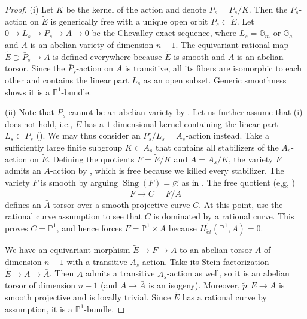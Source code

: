 \documentclass[reqno, letterpaper]{amsart}
\numberwithin{equation}{subsection}
\let\emptyset\varnothing
\let\to\longrightarrow
\newcommand{\GG}{\mathbb{G}}
\newcommand{\PP}{\mathbb{P}}
\DeclareMathOperator{\Sing}{Sing}
\begin{document}
		\begin{proof}
			(i) Let $K$ be the kernel of the action and denote $\bar P_s = P^\circ_s / K$. Then the $\bar P_s$-action on $\tilde E$ is generically free with a unique open orbit $\bar P_s \subset \tilde E$. Let $0 \to \bar L_s \to \bar P_s \to A \to 0$ be the Chevalley exact sequence, where $\bar L_s = \GG_m$ or $\GG_a$ and $A$ is an abelian variety of dimension $n-1$. The equivariant rational map $\tilde E \supset \bar P_s \to A$ is defined everywhere because $\tilde E$ is smooth and $A$ is an abelian torsor. Since the $\bar P_s$-action on $A$ is transitive, all its fibers are isomorphic to each other and contains the linear part $\bar L_s$ as an open subset. Generic smoothness shows it is a $\PP^1$-bundle.
			
			\medskip
			
			(ii) Note that $P_s$ cannot be an abelian variety by . Let us further assume that (i) does not hold, i.e., $E$ has a $1$-dimensional kernel containing the linear part $L_s \subset P^\circ_s$ (). We may thus consider an $P_s^\circ/L_s = A_s$-action instead. Take a sufficiently large finite subgroup $K \subset A_s$ that contains all stabilizers of the $A_s$-action on $\tilde E$. Defining the quotients $F = \tilde E / K$ and $\bar A = A_s / K$, the variety $F$ admits an $\bar A$-action by , which is free because we killed every stabilizer. The variety $F$ is smooth by arguing $\Sing(F) = \emptyset$ as in . The free quotient (e,g, \cite[Tag~06PH]{stacks-project})
			\[ F \to C = F/\bar A \]
			defines an $\bar A$-torsor over a smooth projective curve $C$. At this point, use the rational curve assumption to see that $C$ is dominated by a rational curve. This proves $C = \PP^1$, and hence forces $F = \PP^1 \times \bar A$ because $H^1_{\acute et} (\PP^1, \bar A) = 0$.
			
			\medskip
			
			We have an equivariant morphism $\tilde E \to F \to \bar A$ to an abelian torsor $\bar A$ of dimension $n-1$ with a transitive $A_s$-action. Take its Stein factorization $\tilde E \to A \to \bar A$. Then $A$ admits a transitive $A_s$-action as well, so it is an abelian torsor of dimension $n-1$ (and $A \to \bar A$ is an isogeny). Moreover, $\tilde p : \tilde E \to A$ is smooth projective and is locally trivial. Since $\tilde E$ has a rational curve by assumption, it is a $\PP^1$-bundle.
		\end{proof}
		
\end{document}
